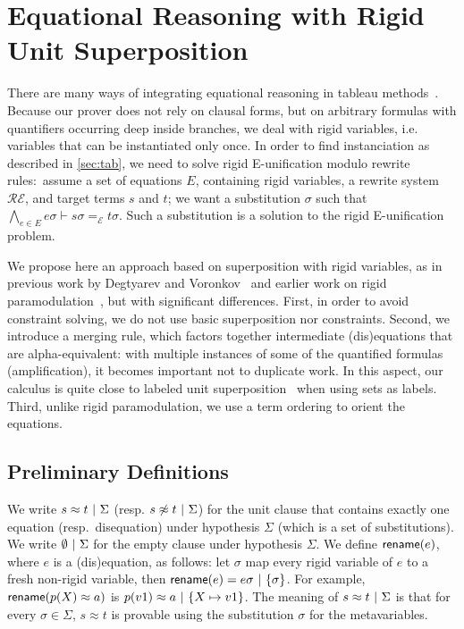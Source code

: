 
\section{Equational Reasoning with Rigid Unit Superposition}
\label{sec:super}

There are many ways of integrating equational reasoning in tableau
methods~\cite{DB75,LS02,BR15,DV96}. Because our prover does not rely on clausal
forms, but on arbitrary formulas with quantifiers occurring deep inside
branches, we deal with rigid variables, i.e. variables that can be instantiated
only once. In order to find instanciation as described in \ref{sec:tab},
we need to solve rigid E-unification modulo rewrite rules:~assume a set of
equations $E$, containing rigid variables, a rewrite system $\mathcal{RE}$,
and target terms $s$ and $t$; we want a substitution $\sigma$ such that
$\bigwedge_{e \in E} e\sigma \vdash s\sigma =_\mathcal{E} t\sigma$. Such a
substitution is a solution to the rigid E-unification problem.

We propose here an approach based on superposition with rigid variables, as in
previous work by Degtyarev and Voronkov~\cite{DV96} and earlier work on rigid
paramodulation~\cite{DAP00}, but with significant differences. First, in order
to avoid constraint solving, we do not use basic superposition nor
constraints. Second, we introduce a merging rule, which factors together
intermediate (dis)equations that are alpha-equivalent: with multiple instances
of some of the quantified formulas (amplification), it becomes important not to
duplicate work. In this aspect, our calculus is quite close to labeled unit
superposition~\cite{KS10} when using sets as labels. Third, unlike rigid
paramodulation, we use a term ordering to orient the equations.

\subsection{Preliminary Definitions}

We write $  s \approx t  ~|~  \Sigma$ (resp.
$ s \not\approx t  ~|~  \Sigma$) for the unit clause that contains
exactly one equation (resp.~disequation) under hypothesis $\Sigma$ (which is a
set of substitutions). We write $\emptyset ~|~ \Sigma$ for the
empty clause under hypothesis $\Sigma$. We define $\textsf{rename}(e)$, where $e$
is a (dis)equation, as follows: let $\sigma$ map every rigid variable of $e$ to
a fresh non-rigid variable, then
$\textsf{rename}(e) =  e\sigma  ~|~  \{ \sigma \} $. For example,
$\textsf{rename}(p(X)\approx a)$ is $ p(v1)\approx a ~|~  \{ X\mapsto
v1\} $.
The meaning of $s \approx t ~|~  \Sigma$ is
that for every $\sigma \in \Sigma$, $s \approx t$ is provable using the
substitution $\sigma$ for the metavariables.

